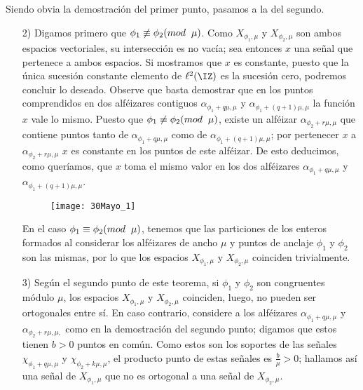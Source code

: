 \begin{dem}
Siendo obvia la demostración del primer punto, pasamos
a la del segundo. 
\begin{itemize}
\item[2)] Digamos primero que $\phi_{1} \not\equiv \phi_{2} (mod \hspace{0.2cm} \mu)$.
Como $X_{\phi_{1}, \mu}$ y $X_{\phi_{2}, \mu}$ son ambos
espacios vectoriales, su intersección es no vacía; 
sea entonces $x$
una señal que pertenece a ambos
espacios. Si mostramos que $x$ es constante,
puesto que la única sucesión constante elemento de $\ell^{2}(\IZ)$
es la sucesión cero, podremos concluir lo deseado. Observe que basta
demostrar que en los puntos comprendidos en 
dos alféizares contiguos
$\alpha_{\phi_{1} +q \mu, \mu}$ y $\alpha_{\phi_{1} +(q+1) \mu, \mu}$
la función
$x$ vale lo mismo. Puesto que 
$\phi_{1} \not\equiv \phi_{2} (mod \hspace{0.2cm} \mu)$, existe un
alféizar $\alpha_{\phi_{2} + r \mu, \mu}$ que contiene puntos
tanto de $\alpha_{\phi_{1} +q \mu, \mu}$
como de $\alpha_{\phi_{1} +(q+1) \mu, \mu}$; por
pertenecer $x$ a $\alpha_{\phi_{2} + r \mu, \mu}$
$x$ es constante en los puntos de este alféizar. De 
esto deducimos, como queríamos, que $x$ toma 
el mismo valor en los dos alféizares 
$\alpha_{\phi_{1} +q \mu, \mu}$ y $\alpha_{\phi_{1} +(q+1) \mu, \mu}$.

\begin{figure}[H]
	\centering
	\texttt{[image: 30Mayo\_1]}
	\caption{}
\end{figure}


En el caso $\phi_{1} \equiv \phi_{2} (mod \hspace{0.2cm} \mu)$,
tenemos que las particiones de los enteros
formados al considerar los alféizares de ancho
$\mu$ y puntos de anclaje $\phi_{1}$
y $\phi_{2}$ son las mismas, por lo que los espacios
$X_{\phi_{1}, \mu}$ y $X_{\phi_{2}, \mu}$ coinciden
trivialmente.

\item[3)] Según el segundo punto
de este teorema, si $\phi_{1}$
y $\phi_{2}$ son congruentes módulo $\mu$, los espacios
$X_{\phi_{1}, \mu}$ y $X_{\phi_{2}, \mu}$ coinciden, luego,
no pueden ser ortogonales entre sí. En caso contrario,
considere a los alféizares
$\alpha_{\phi_{1} +q \mu, \mu}$
y $\alpha_{\phi_{2} + r  \mu, \mu,}$ como en la demostración
del segundo punto;
digamos que estos tienen $b>0$
puntos en común. Como estos son los soportes
de las señales $\chi_{\phi_{1}+q \mu, \mu}$
y $\chi_{\phi_{2}+k \mu, \mu}$, el producto punto
de estas señales es $\frac{b}{\mu }>0$;
hallamos así una señal de 
$X_{\phi_{1}, \mu}$ que no 
es ortogonal a una señal de  $X_{\phi_{2}, \mu}$.


\end{itemize}
\end{dem}
